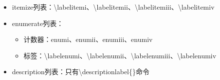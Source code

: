 ﻿\documentclass{article}
\begin{document}
\hrulefill

    \begin{itemize}
        \item itemize列表：\textbackslash{}labelitemi、\textbackslash{}labelitemii、\textbackslash{}labelitemiii、\textbackslash{}labelitemiv
        \item enumerate列表：
        \begin{itemize}
            \item 计数器：enumi、enumii、enumiii、enumiv
            \item 标签：\textbackslash{}labelenumi、\textbackslash{}labelenumii、\textbackslash{}labelenumiii、\textbackslash{}labelenumiv
        \end{itemize}
        \item description列表：只有\textbackslash{}descriptionlabel\{\}命令
    \end{itemize}

\hrulefill
\end{document}
